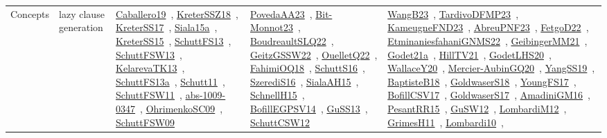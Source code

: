 {\begin{longtable}{lp{3cm}>{\raggedright\arraybackslash}p{6cm}>{\raggedright\arraybackslash}p{6cm}>{\raggedright\arraybackslash}p{8cm}}
Concepts & lazy clause generation & \href{works/Caballero19.pdf}{Caballero19}~\cite{Caballero19}, \href{works/KreterSSZ18.pdf}{KreterSSZ18}~\cite{KreterSSZ18}, \href{works/KreterSS17.pdf}{KreterSS17}~\cite{KreterSS17}, \href{works/Siala15a.pdf}{Siala15a}~\cite{Siala15a}, \href{works/KreterSS15.pdf}{KreterSS15}~\cite{KreterSS15}, \href{works/SchuttFS13.pdf}{SchuttFS13}~\cite{SchuttFS13}, \href{works/SchuttFSW13.pdf}{SchuttFSW13}~\cite{SchuttFSW13}, \href{works/KelarevaTK13.pdf}{KelarevaTK13}~\cite{KelarevaTK13}, \href{works/SchuttFS13a.pdf}{SchuttFS13a}~\cite{SchuttFS13a}, \href{works/Schutt11.pdf}{Schutt11}~\cite{Schutt11}, \href{works/SchuttFSW11.pdf}{SchuttFSW11}~\cite{SchuttFSW11}, \href{works/abs-1009-0347.pdf}{abs-1009-0347}~\cite{abs-1009-0347}, \href{works/OhrimenkoSC09.pdf}{OhrimenkoSC09}~\cite{OhrimenkoSC09}, \href{works/SchuttFSW09.pdf}{SchuttFSW09}~\cite{SchuttFSW09} & \href{works/PovedaAA23.pdf}{PovedaAA23}~\cite{PovedaAA23}, \href{works/Bit-Monnot23.pdf}{Bit-Monnot23}~\cite{Bit-Monnot23}, \href{works/BoudreaultSLQ22.pdf}{BoudreaultSLQ22}~\cite{BoudreaultSLQ22}, \href{works/GeitzGSSW22.pdf}{GeitzGSSW22}~\cite{GeitzGSSW22}, \href{works/OuelletQ22.pdf}{OuelletQ22}~\cite{OuelletQ22}, \href{works/FahimiOQ18.pdf}{FahimiOQ18}~\cite{FahimiOQ18}, \href{works/SchuttS16.pdf}{SchuttS16}~\cite{SchuttS16}, \href{works/SzerediS16.pdf}{SzerediS16}~\cite{SzerediS16}, \href{works/SialaAH15.pdf}{SialaAH15}~\cite{SialaAH15}, \href{works/SchnellH15.pdf}{SchnellH15}~\cite{SchnellH15}, \href{works/BofillEGPSV14.pdf}{BofillEGPSV14}~\cite{BofillEGPSV14}, \href{works/GuSS13.pdf}{GuSS13}~\cite{GuSS13}, \href{works/SchuttCSW12.pdf}{SchuttCSW12}~\cite{SchuttCSW12} & \href{works/WangB23.pdf}{WangB23}~\cite{WangB23}, \href{works/TardivoDFMP23.pdf}{TardivoDFMP23}~\cite{TardivoDFMP23}, \href{works/KameugneFND23.pdf}{KameugneFND23}~\cite{KameugneFND23}, \href{works/AbreuPNF23.pdf}{AbreuPNF23}~\cite{AbreuPNF23}, \href{works/FetgoD22.pdf}{FetgoD22}~\cite{FetgoD22}, \href{works/EtminaniesfahaniGNMS22.pdf}{EtminaniesfahaniGNMS22}~\cite{EtminaniesfahaniGNMS22}, \href{works/GeibingerMM21.pdf}{GeibingerMM21}~\cite{GeibingerMM21}, \href{works/Godet21a.pdf}{Godet21a}~\cite{Godet21a}, \href{works/HillTV21.pdf}{HillTV21}~\cite{HillTV21}, \href{works/GodetLHS20.pdf}{GodetLHS20}~\cite{GodetLHS20}, \href{works/WallaceY20.pdf}{WallaceY20}~\cite{WallaceY20}, \href{works/Mercier-AubinGQ20.pdf}{Mercier-AubinGQ20}~\cite{Mercier-AubinGQ20}, \href{works/YangSS19.pdf}{YangSS19}~\cite{YangSS19}, \href{works/BaptisteB18.pdf}{BaptisteB18}~\cite{BaptisteB18}, \href{works/GoldwaserS18.pdf}{GoldwaserS18}~\cite{GoldwaserS18}, \href{works/YoungFS17.pdf}{YoungFS17}~\cite{YoungFS17}, \href{works/BofillCSV17.pdf}{BofillCSV17}~\cite{BofillCSV17}, \href{works/GoldwaserS17.pdf}{GoldwaserS17}~\cite{GoldwaserS17}, \href{works/AmadiniGM16.pdf}{AmadiniGM16}~\cite{AmadiniGM16}, \href{works/PesantRR15.pdf}{PesantRR15}~\cite{PesantRR15}, \href{works/GuSW12.pdf}{GuSW12}~\cite{GuSW12}, \href{works/LombardiM12.pdf}{LombardiM12}~\cite{LombardiM12}, \href{works/GrimesH11.pdf}{GrimesH11}~\cite{GrimesH11}, \href{works/Lombardi10.pdf}{Lombardi10}~\cite{Lombardi10}, 
\end{longtable}}
